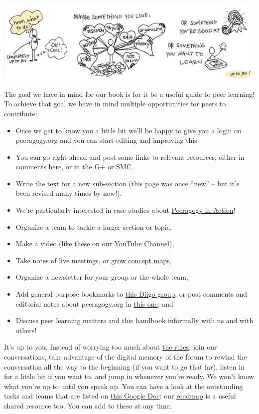 \begin{center}
\includegraphics[width=.9\textwidth]{../pictures/what_to_do_color.jpg}
\end{center}

The goal we have in mind for our book is for it be a useful guide to
peer learning! To achieve that goal we have in mind multiple
opportunities for peers to contribute:

\begin{itemize}
\item
  Once we get to know you a little bit we'll be happy to give you a
  login on peeragogy.org and you can start editing and improving this.
\item
  You can go right ahead and post some links to relevant resources,
  either in comments here, or in the G+ or SMC.
\item
  Write the text for a new sub-section (this page was once ``new'' --
  but it's been revised many times by now!).
\item
  We're particularly interested in case studies about
  \href{http://peeragogy.org/peeragogy-in-action/}{Peeragogy in Action}!
\item
  Organize a team to tackle a larger section or topic.
\item
  Make a video (like these on our
  \href{http://www.youtube.com/channel/UCIQY4ja8e4Br-i9U5KnmyZQ}{YouTube
  Channel}),
\item
  Take notes of live meetings, or
  \href{http://cmapspublic3.ihmc.us/rid=1K81VLSK7-1RL0RQ4-WZK/Peeragogy\%20Cmap.cmap}{grow
  concept maps,}
\item
  Organize a newsletter for your group or the whole team,
\item
  Add general purpose bookmarks to
  \href{http://groups.diigo.com/group/peeragogy-handbook}{this Diigo
  group}, or post comments and editorial notes about peeragogy.org in
  \href{http://groups.diigo.com/group/peering-into-peeragogy\%20}{this
  one}; and
\item
  Discuss peer learning matters and this handbook informally with us and
  with others!
\end{itemize}
It's up to you. Instead of worrying too much about
\href{http://peeragogy.org/co-working/}{the rules}, join our
conversations, take advantage of the digital memory of the forum to
rewind the conversation all the way to the beginning (if you want to go
that far), listen in for a little bit if you want to, and jump in
whenever you're ready. We won't know what you're up to until you speak
up. You can have a look at the outstanding tasks and teams that are
listed on
\href{https://docs.google.com/document/d/1\_2I-z-Pt5NUKk-fpy4jsqxFeXbWS4ao4sIhkxCcRVeI/edit\#}{this
Google Doc}: our
\href{http://peeragogy.org/peeragogy-org-roadmap/}{roadmap} is a useful
shared resource too. You can add to these at any time.

